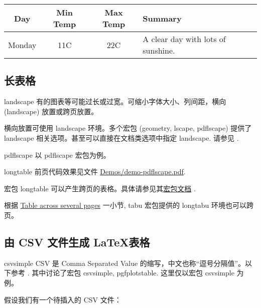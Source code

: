 \documentclass[final]{ctexbeamer}
\begin{document}
\begin{frame}[fragile]
\begin{vertlst}
\begin{tabular}{ *{3}{| c} | p{3.5cm} |}
\hline
Day & Min Temp & Max Temp & Summary \\ \hline
Monday & 11C & 22C & A clear day with lots of sunshine. \\ \hline
\end{tabular}
\end{vertlst}
\end{frame}


\subsection{长表格}
\begin{frame}[fragile]{landscape}
有的图表等可能过长或过宽。可缩小字体大小、列间距，横向 (landscape) 放置或跨页放置。

横向放置可使用 landscape 环境。多个宏包 (geometry, lscape, pdflscape) 提供了 landscape 相关选项。甚至可以直接在文档类选项中指定 landscape. 请参见 \cite{texblog-table}.
\end{frame}

\begin{frame}[fragile]{pdflscape}
以 pdflscape 宏包为例。
\end{frame}


\begin{frame}[fragile]{longtable}
前页代码效果见文件 \href{run:Demos/demo-pdflscape.pdf}{Demos/demo-pdflscape.pdf}.

宏包 longtable 可以产生跨页的表格。具体请参见其\href{http://mirrors.ctan.org/macros/latex/required/tools/longtable.pdf}{宏包文档} \cite{longtable}.

根据 \cite{wiki:tables} 
\href{https://en.wikibooks.org/wiki/LaTeX/Tables#The\_tabu\_environment}{Table across several pages} 一小节, tabu 宏包提供的 longtabu 环境也可以跨页。
\end{frame}

\subsection[CSV to LaTeX tables]{由 CSV 文件生成 \LaTeX 表格}
\begin{frame}[fragile]{csvsimple}
CSV 是 Comma Separated Value 的缩写，中文也称“逗号分隔值”。以下参考 \cite{texblog-csv}. 其中讨论了宏包 csvsimple, pgfplotstable. 这里仅以宏包 csvsimple 为例。

假设我们有一个待插入的 CSV 文件：
\end{frame}
\end{document}
